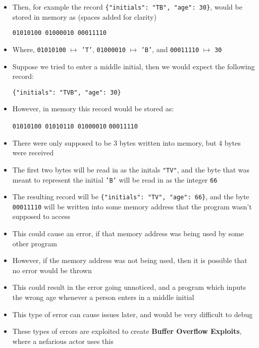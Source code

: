 \documentclass{article}
\newcommand {\code}{\texttt}
\begin{document}
\begin  {itemize}
\begin {center}
\begin {tabular}{lll}
					\hline
				\end {tabular}
			\end {center}
		\item Then, for example the record \code {\{"initials": "TB", "age": 30\}}, would
			be stored in memory as (spaces added for clarity)
			\begin {center}
				\code {01010100 01000010 00011110}
			\end {center}
		\item Where, \code {01010100} $ \mapsto$ \code {'T'}, \code {01000010}
			$ \mapsto$ \code {'B'}, and \code {00011110} $ \mapsto$ 
			\code {30}
		\item Suppose we tried to enter a middle initial, then we would expect the
			following record:
			\begin {center}
				\code {\{"initials": "TVB", "age": 30\}}
			\end {center}
		\item However, in memory this record would be stored as:
			\begin {center}
				{\color {green}\code {01010100 01010110 01000010}}
				{\color {red} \code {00011110}}
			\end {center}
		\item There were only supposed to be 3 bytes written into memory, but 4 bytes
			were received
		\item The first two bytes will be read in as the initals \code {"TV"}, and
			the byte that was meant to represent the initial \code {'B'} will be
			read in as the integer \code {66}
		\item The resulting record will be \code {\{"initials": "TV", "age": 66\}},
			and the byte {\color {red} \code {00011110}} will be written into some 
			memory address that the program wasn't supposed to access
		\item This could cause an error, if that memory address was being used by some
			other program
		\item However, if the memory address was not being used, then it is possible that
			no error would be thrown
		\item This could result in the error going unnoticed, and a program which
			inputs the wrong age whenever a person enters in a middle initial
		\item This type of error can cause issues later, and would be very difficult to
			debug
		\item These types of errors are exploited to create 
			\textbf {Buffer Overflow Exploits}, where a nefarious actor uses this

\end{itemize}
\end{document}
